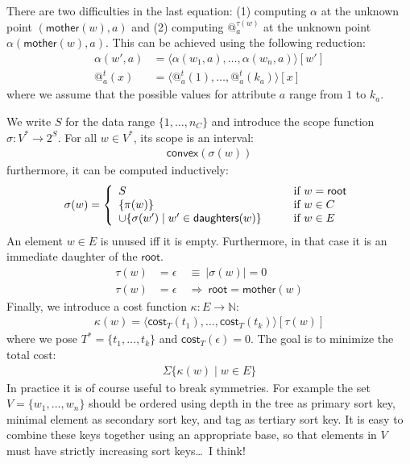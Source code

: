 \documentclass{article}
\makeatletter
\newcommand{\NAT}{{\mathbb N}}
\newcommand{\SET}[1]{{\{{#1}\}}}
\newcommand{\COST}{{\textsf{cost}}}
\newcommand{\TO}{\rightarrow}
\newcommand{\ROOT}{{\textsf{root}}}
\newcommand{\MOTHER}{{\textsf{mother}}}
\newcommand{\DAUGHTERS}{{\textsf{daughters}}}
\newcommand{\UNION}{\cup}
\newcommand{\TUP}[1]{{\langle{#1}\rangle}}
\newcommand{\EPS}{\epsilon}
\newcommand{\AT}[2]{@^{#1}_{#2}}
\newcommand{\CONVEX}{{\textsf{convex}}}
\newcommand{\IMPLIES}{\Rightarrow}
\makeatother
\begin{document}
There are two difficulties in the last equation: (1) computing
$\alpha$ at the unknown point $(\MOTHER(w),a)$ and (2) computing
$\AT{\tau(w)}{a}$ at the unknown point $\alpha(\MOTHER(w),a)$.  This
can be achieved using the following reduction:
\begin{align*}
\alpha(w',a) &= \TUP{\alpha(w_1,a),\ldots,\alpha(w_n,a)}[w']\\
\AT{t}{a}(x) &= \TUP{\AT{t}{a}(1),\ldots,\AT{t}{a}(k_a)}[x]
\end{align*}
where we assume that the possible values for attribute $a$ range from
$1$ to $k_a$.

We write $S$ for the data range $\SET{1,\ldots,n_C}$ and introduce the
scope function $\sigma:V^*\TO 2^S$.  For all $w\in V^*$, its scope is
an interval:
\begin{gather*}
\CONVEX(\sigma(w))
\end{gather*}
furthermore, it can be computed inductively:
\begin{gather*}
\sigma(w) = \left\{
\begin{array}{l@{\hspace{1cm}}l}
S & \text{if } w=\ROOT\\
\SET{\pi(w)} & \text{if } w\in C\\
{\UNION}\SET{\sigma(w')\mid w'\in\DAUGHTERS(w)} & \text{if } w\in E
\end{array}
\right.
\end{gather*}
An element $w\in E$ is unused iff it is empty.  Furthermore, in that
case it is an immediate daughter of the $\ROOT$.
\begin{align*}
\tau(w)&=\EPS\ &\equiv\ |\sigma(w)|=0\\
\tau(w)&=\EPS\ &\IMPLIES\ \ROOT=\MOTHER(w)
\end{align*}
Finally, we introduce a cost function $\kappa:E\TO\NAT$:
\begin{gather*}
\kappa(w) = \TUP{\COST_T(t_1),\ldots,\COST_T(t_k)}[\tau(w)]
\end{gather*}
where we pose $T^*=\SET{t_1,\ldots,t_k}$ and $\COST_T(\EPS)=0$.
The goal is to minimize the total cost:
\begin{gather*}
{\Sigma}\SET{\kappa(w)\mid w\in E}
\end{gather*}
In practice it is of course useful to break symmetries.  For example
the set $V=\SET{w_1,\ldots,w_n}$ should be ordered using depth in the
tree as primary sort key, minimal element as secondary sort key, and
tag as tertiary sort key.  It is easy to combine these keys together
using an appropriate base, so that elements in $V$ must have strictly
increasing sort keys\ldots\ I think!
\end{document}
